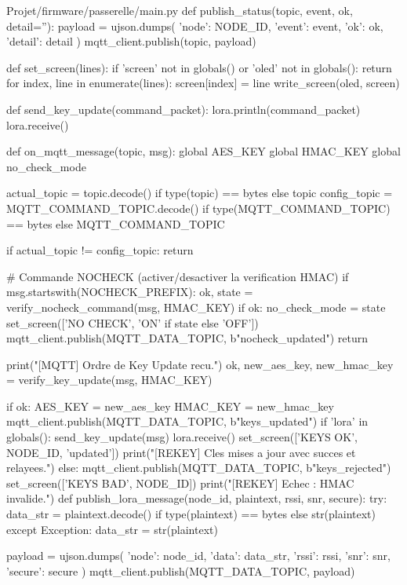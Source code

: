 \documentclass[a4paper,11pt]{report}
\begin{document}
\begin{pycode}{Projet/firmware/passerelle/main.py}
def publish_status(topic, event, ok, detail=''):
    payload = ujson.dumps({
        'node': NODE_ID,
        'event': event,
        'ok': ok,
        'detail': detail
    })
    mqtt_client.publish(topic, payload)


def set_screen(lines):
    if 'screen' not in globals() or 'oled' not in globals():
        return
    for index, line in enumerate(lines):
        screen[index] = line
    write_screen(oled, screen)


def send_key_update(command_packet):
    lora.println(command_packet)
    lora.receive()


def on_mqtt_message(topic, msg):
    global AES_KEY
    global HMAC_KEY
    global no_check_mode

    actual_topic = topic.decode() if type(topic) == bytes else topic
    config_topic = MQTT_COMMAND_TOPIC.decode() if type(MQTT_COMMAND_TOPIC) == bytes else MQTT_COMMAND_TOPIC

    if actual_topic != config_topic:
        return

    # Commande NOCHECK (activer/desactiver la verification HMAC)
    if msg.startswith(NOCHECK_PREFIX):
        ok, state = verify_nocheck_command(msg, HMAC_KEY)
        if ok:
            no_check_mode = state
            set_screen(['NO CHECK', 'ON' if state else 'OFF'])
            mqtt_client.publish(MQTT_DATA_TOPIC, b"nocheck_updated")
        return

    print("[MQTT] Ordre de Key Update recu.")
    ok, new_aes_key, new_hmac_key = verify_key_update(msg, HMAC_KEY)

    if ok:
        AES_KEY = new_aes_key
        HMAC_KEY = new_hmac_key
        mqtt_client.publish(MQTT_DATA_TOPIC, b"keys_updated")
        if 'lora' in globals():
            send_key_update(msg)
            lora.receive()
        set_screen(['KEYS OK', NODE_ID, 'updated'])
        print("[REKEY] Cles mises a jour avec succes et relayees.")
    else:
        mqtt_client.publish(MQTT_DATA_TOPIC, b"keys_rejected")
        set_screen(['KEYS BAD', NODE_ID])
        print("[REKEY] Echec : HMAC invalide.")
def publish_lora_message(node_id, plaintext, rssi, snr, secure):
    try:
        data_str = plaintext.decode() if type(plaintext) == bytes else str(plaintext)
    except Exception:
        data_str = str(plaintext)

    payload = ujson.dumps({
        'node': node_id,
        'data': data_str,
        'rssi': rssi,
        'snr': snr,
        'secure': secure
    })
    mqtt_client.publish(MQTT_DATA_TOPIC, payload)



\end{pycode}
\end{document}

